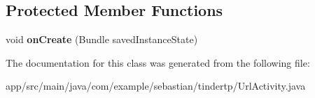 \subsection*{Protected Member Functions}
\begin{DoxyCompactItemize}
\item 
void {\bfseries on\+Create} (Bundle saved\+Instance\+State)\hypertarget{classcom_1_1example_1_1sebastian_1_1tindertp_1_1UrlActivity_a4921f3f005e2fc881d402bbc195e2003}{}\label{classcom_1_1example_1_1sebastian_1_1tindertp_1_1UrlActivity_a4921f3f005e2fc881d402bbc195e2003}

\end{DoxyCompactItemize}


The documentation for this class was generated from the following file\+:\begin{DoxyCompactItemize}
\item 
app/src/main/java/com/example/sebastian/tindertp/Url\+Activity.\+java\end{DoxyCompactItemize}
